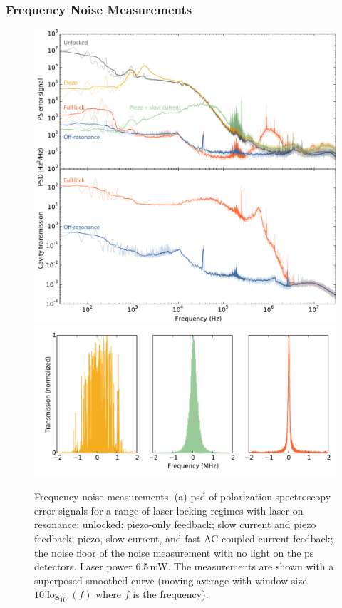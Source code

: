 \subsubsection{Frequency Noise Measurements}

\begin{figure}[htbp]
\centering
    \includegraphics[width=0.9\linewidth]{chapter1/Figs/fig4a_v3.pdf}
    \label{fig:PSDs}
    \includegraphics[width=0.9\linewidth]{chapter1/Figs/fig4b_v1.pdf}
    \label{fig:cavity_scans}
\caption{Frequency noise measurements. (a) \Gls*{psd} of polarization spectroscopy error signals for a range of laser locking regimes with laser on resonance: unlocked; piezo-only feedback; slow current and piezo feedback; piezo, slow current, and fast AC-coupled current feedback; the noise floor of the noise measurement with no light on the \gls*{ps} detectors. Laser power 6.5\,mW.
The measurements are shown with a superposed smoothed curve (moving average  with window size $10\log_{10}(f)$ where $f$ is the frequency).
}
\end{figure}
